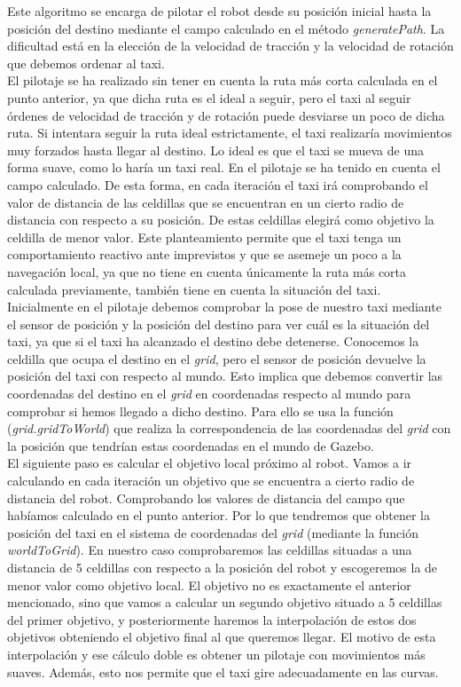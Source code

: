 Este algoritmo se encarga de pilotar el robot desde su posición inicial hasta la posición del destino mediante el campo calculado en el método \textit{generatePath}. La dificultad está en la elección de la velocidad de tracción y la velocidad de rotación que debemos ordenar al taxi. \\

El pilotaje se ha realizado sin tener en cuenta la ruta más corta calculada en el punto anterior, ya que dicha ruta es el ideal a seguir, pero el taxi al seguir órdenes de velocidad de tracción y de rotación puede desviarse un poco de dicha ruta. Si intentara seguir la ruta ideal estrictamente, el taxi realizaría movimientos muy forzados hasta llegar al destino. Lo ideal es que el taxi se mueva de una forma suave, como lo haría un taxi real. En el pilotaje se ha tenido en cuenta el campo calculado. De esta forma, en cada iteración el taxi irá comprobando el valor de distancia de las celdillas que se encuentran en un cierto radio de distancia con respecto a su posición. De estas celdillas elegirá como objetivo la celdilla de menor valor. Este planteamiento permite que el taxi tenga un comportamiento reactivo ante imprevistos y que se asemeje un poco a la navegación local, ya que no tiene en cuenta únicamente la ruta más corta calculada previamente, también tiene en cuenta la situación del taxi.\\

Inicialmente en el pilotaje debemos comprobar la pose de nuestro taxi mediante el sensor de posición y la posición del destino para ver cuál es la situación del taxi, ya que si el taxi ha alcanzado el destino debe detenerse. Conocemos la celdilla que ocupa el destino en el \textit{grid}, pero el sensor de posición devuelve la posición del taxi con respecto al mundo. Esto implica que debemos convertir las coordenadas del destino en el \textit{grid} en coordenadas respecto al mundo para comprobar si hemos llegado a dicho destino. Para ello se usa la función (\textit{grid.gridToWorld}) que realiza la correspondencia de las coordenadas del \textit{grid} con la posición que tendrían estas coordenadas en el mundo de Gazebo.\\

El siguiente paso es calcular el objetivo local próximo al robot. Vamos a ir calculando en cada iteración un objetivo que se encuentra a cierto radio de distancia del robot. Comprobando los valores de distancia del campo que habíamos calculado en el punto anterior. Por lo que tendremos que obtener la posición del taxi en el sistema de coordenadas del \textit{grid} (mediante la función \textit{worldToGrid}). En nuestro caso comprobaremos las celdillas situadas a una distancia de 5 celdillas con respecto a la posición del robot y escogeremos la de menor valor como objetivo local. El objetivo no es exactamente el anterior mencionado, sino que vamos a calcular un segundo objetivo situado a 5 celdillas del primer objetivo, y posteriormente haremos la interpolación de estos dos objetivos obteniendo el objetivo final al que queremos llegar. El motivo de esta interpolación y ese cálculo doble es obtener un pilotaje con movimientos más suaves. Además, esto nos permite que el taxi gire adecuadamente en las curvas. \\

